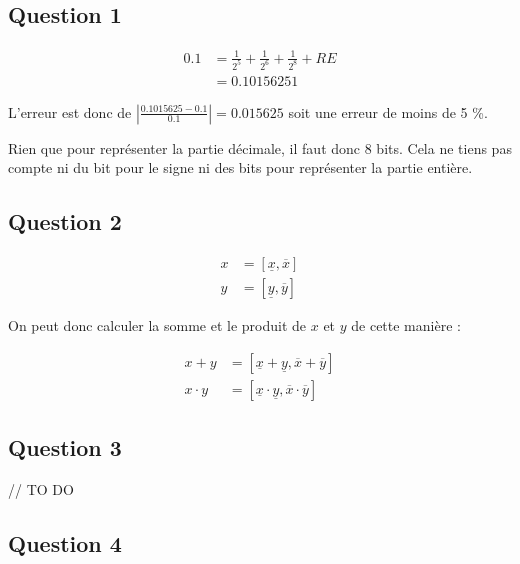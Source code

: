 \subsection{Question 1}

\begin{equation}
	\begin{aligned}
		0.1 &= \frac{1}{2^5} + \frac{1}{2^6} + \frac{1}{2^8} + RE \\
		&= 0.1015625
	1\end{aligned}
\end{equation}

L'erreur est donc de $|\frac{0.1015625 - 0.1}{0.1}| = 0.015625$ soit une erreur de moins de 5 \%.

Rien que pour représenter la partie décimale, il faut donc 8 bits. Cela ne tiens pas compte ni du bit pour le signe ni des bits pour représenter la partie entière.

\subsection{Question 2}

\begin{equation}
	\begin{aligned}
		x &= [\underline{x}, \overline{x}]\\
		y &= [\underline{y}, \overline{y}]
	\end{aligned}
\end{equation}

On peut donc calculer la somme et le produit de $x$ et $y$ de cette manière :

\begin{equation}
	\begin{aligned}
		x + y &= [\underline{x} + \underline{y}, \overline{x} + \overline{y}]\\
		x \cdot y &= [\underline{x} \cdot \underline{y}, \overline{x} \cdot \overline{y}]
	\end{aligned}
\end{equation}

\subsection{Question 3}

// TO DO

\subsection{Question 4}

